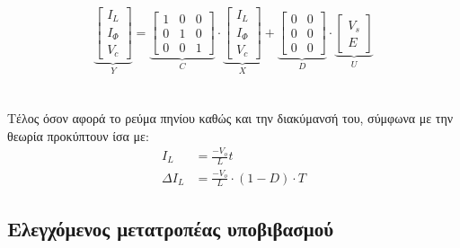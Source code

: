 \begin{equation*}
	\underbrace{
		\begin{bmatrix}
			I_L\\
			I_{\Phi}\\
			V_c
		\end{bmatrix}
	}_Y
	=
	\underbrace{
		\begin{bmatrix}
			1 & 0 & 0\\
			0 & 1 & 0\\
			0 & 0 & 1
		\end{bmatrix}
	}_C
	\cdot
	\underbrace{
		\begin{bmatrix}
			I_L\\
			I_{\Phi}\\
			V_c
		\end{bmatrix}
	}_X
	+ 
	\underbrace{	
		\begin{bmatrix}
			0 & 0 \\
			0 & 0 \\
			0 & 0
		\end{bmatrix}
	}_D
	\cdot
	\underbrace{
		\begin{bmatrix}
			V_s\\
			E		
		\end{bmatrix}
	}_U
\end{equation*}
\noindent\\\\
Τέλος όσον αφορά το ρεύμα πηνίου καθώς και την διακύμανσή του, σύμφωνα με την θεωρία προκύπτουν ίσα με:
\begin{align}
	I_L &= \frac{- V_o}{L}t \label{I_L_2}\\	
	\Delta I_L &= \frac{- V_o}{L} \cdot (1 - D) \cdot T \label{DI_L_2}
\end{align}

\subsection{Ελεγχόμενος μετατροπέας υποβιβασμού}